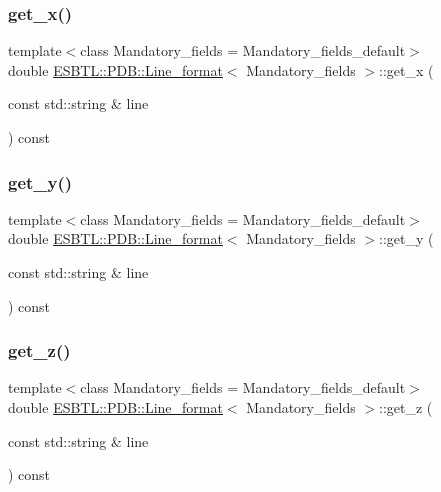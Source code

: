 \subsubsection{\texorpdfstring{get\+\_\+x()}{get\_x()}}
{\footnotesize\ttfamily template$<$class Mandatory\+\_\+fields  = Mandatory\+\_\+fields\+\_\+default$>$ \\
double \hyperlink{classESBTL_1_1PDB_1_1Line__format}{E\+S\+B\+T\+L\+::\+P\+D\+B\+::\+Line\+\_\+format}$<$ Mandatory\+\_\+fields $>$\+::get\+\_\+x (\begin{DoxyParamCaption}\item[{const std\+::string \&}]{line }\end{DoxyParamCaption}) const\hspace{0.3cm}{\ttfamily [inline]}}

\mbox{\label{classESBTL_1_1PDB_1_1Line__format_a48f80ae039ee691802faa980fecb4476}} 
\subsubsection{\texorpdfstring{get\+\_\+y()}{get\_y()}}
{\footnotesize\ttfamily template$<$class Mandatory\+\_\+fields  = Mandatory\+\_\+fields\+\_\+default$>$ \\
double \hyperlink{classESBTL_1_1PDB_1_1Line__format}{E\+S\+B\+T\+L\+::\+P\+D\+B\+::\+Line\+\_\+format}$<$ Mandatory\+\_\+fields $>$\+::get\+\_\+y (\begin{DoxyParamCaption}\item[{const std\+::string \&}]{line }\end{DoxyParamCaption}) const\hspace{0.3cm}{\ttfamily [inline]}}

\mbox{\label{classESBTL_1_1PDB_1_1Line__format_a7d7e983d438a17bcd8a799baf6c06ab9}} 
\subsubsection{\texorpdfstring{get\+\_\+z()}{get\_z()}}
{\footnotesize\ttfamily template$<$class Mandatory\+\_\+fields  = Mandatory\+\_\+fields\+\_\+default$>$ \\
double \hyperlink{classESBTL_1_1PDB_1_1Line__format}{E\+S\+B\+T\+L\+::\+P\+D\+B\+::\+Line\+\_\+format}$<$ Mandatory\+\_\+fields $>$\+::get\+\_\+z (\begin{DoxyParamCaption}\item[{const std\+::string \&}]{line }\end{DoxyParamCaption}) const\hspace{0.3cm}{\ttfamily [inline]}}


